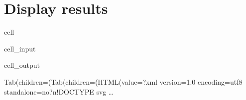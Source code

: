 \documentclass[letterpaper,10pt,english]{jupyterBook}
\begin{document}
\section{Display results}
\label{\detokenize{content/howto/smallmodel/modelstart export up:display-results}}
\begin{sphinxuseclass}{cell}\begin{sphinxVerbatimInput}

\begin{sphinxuseclass}{cell_input}
\begin{sphinxVerbatim}[commandchars=\\\{\}]
 
    \PYG{p}{[} \PYG{p}{]} 
\end{sphinxVerbatim}

\end{sphinxuseclass}\end{sphinxVerbatimInput}
\begin{sphinxVerbatimOutput}

\begin{sphinxuseclass}{cell_output}
\begin{sphinxVerbatim}[commandchars=\\\{\}]
Tab(children=(Tab(children=(HTML(value=\PYGZsq{}\PYGZlt{}?xml version=\PYGZdq{}1.0\PYGZdq{} encoding=\PYGZdq{}utf\PYGZhy{}8\PYGZdq{} standalone=\PYGZdq{}no\PYGZdq{}?\PYGZgt{}\PYGZbs{}n\PYGZlt{}!DOCTYPE svg …
\end{sphinxVerbatim}

\begin{sphinxVerbatim}[commandchars=\\\{\}]

\end{sphinxVerbatim}

\end{sphinxuseclass}\end{sphinxVerbatimOutput}

\end{sphinxuseclass}
\end{document}
